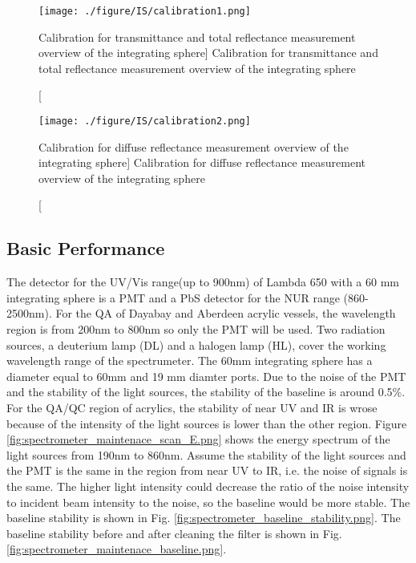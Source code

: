 \begin{figure}
    \centering
    \texttt{[image: ./figure/IS/calibration1.png]}
    \caption
    [Calibration for transmittance and total reflectance measurement overview of the integrating sphere]
    {Calibration for transmittance and total reflectance measurement overview of the integrating sphere}
    \label{fig:calibration1.png}
    \end{figure}

\begin{figure}
    \centering
    \texttt{[image: ./figure/IS/calibration2.png]}
    \caption
    [Calibration for diffuse reflectance measurement overview of the integrating sphere]
    {Calibration for diffuse reflectance measurement overview of the integrating sphere}
    \label{fig:calibration2.png}
    \end{figure}



\subsection{Basic Performance}

The detector for the UV/Vis range(up to 900nm) of Lambda 650 with a 60 mm integrating sphere
is a PMT and a PbS detector for the NUR range (860-2500nm). For the QA of Dayabay and Aberdeen acrylic vessels, the wavelength region is from
200nm to 800nm so only the PMT will be used.
Two radiation sources, a deuterium lamp (DL) and a halogen lamp (HL), cover the working wavelength range of the spectrumeter.
The 60mm integrating sphere has a diameter equal to 60mm and 19 mm diamter ports.
Due to the noise of the PMT and the stability of the
light sources, the stability of the baseline is around 0.5\%.
For the QA/QC region of acrylics, the stability of near UV and IR is wrose because
of the intensity of the light sources is lower than the other region.
Figure \ref{fig:spectrometer_maintenace_scan_E.png} shows the energy spectrum of the light sources from 190nm to
860nm. Assume the stability of the light sources and the PMT is the same in
the region from near UV to IR, i.e. the noise of signals is the same. The higher
light intensity could decrease the ratio of the noise intensity to incident beam intensity to the noise,
so the baseline would be more stable. The baseline stability is shown in Fig. \ref{fig:spectrometer_baseline_stability.png}.
The baseline stability before and after cleaning the filter is shown in Fig. \ref{fig:spectrometer_maintenace_baseline.png}.


